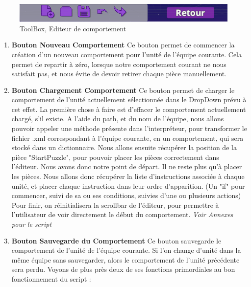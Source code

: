 \documentclass{report}
\begin{document}
\begin{figure}[!h]
	\centering
		\includegraphics[scale=0.50]{ToolBox}
	\caption{ToolBox, Editeur de comportement}
\end{figure}

\begin{enumerate}[label=\Alph*)]
\item\textbf{Bouton Nouveau Comportement} \newline
Ce bouton permet de commencer la création d'un nouveau comportement pour l'unité de l'équipe courante. Cela permet de repartir à zéro, lorsque notre comportement courant ne nous satisfait pas, et nous évite de devoir retirer chaque pièce manuellement.
\item\textbf{Bouton Chargement Comportement} \newline
Ce bouton permet de charger le comportement de l'unité actuellement sélectionnée dans le DropDown prévu à cet effet.
La première chose à faire est d'effacer le comportement actuellement chargé, s'il existe.
A l'aide du path, et du nom de l'équipe, nous allons pouvoir appeler une méthode présente dans l’interpréteur, pour transformer le fichier .xml correspondant à l'équipe courante, en un comportement, qui sera stocké dans un dictionnaire.\newline
Nous allons ensuite récupérer la position de la pièce "StartPuzzle", pour pouvoir placer les pièces correctement dans l'éditeur. Nous avons donc notre point de départ.\newline 
Il ne reste plus qu'à placer les pièces. Nous allons donc récupérer la liste d'instructions associée à chaque unité, et placer chaque instruction dans leur ordre d'apparition. (Un "if" pour commencer, suivi de sa ou ses conditions, suivies d'une ou plusieurs actions)\newline
Pour finir, on réinitialisera la scrollbar de l'éditeur, pour permettre à l'utilisateur de voir directement le début du comportement.\newline
\textit{Voir Annexes pour le script}
\item\textbf{Bouton Sauvegarde du Comportement} \newline
Ce bouton sauvegarde le comportement de l'unité de l'équipe courante. Si l'on change d'unité dans la même équipe sans sauvegarder, alors le comportement de l'unité précédente sera perdu.\newline
Voyons de plus près deux de ses fonctions primordiales au bon fonctionnement du script :


\end{enumerate}
\end{document}
